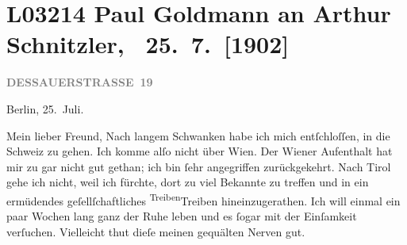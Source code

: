 

\section[ Paul Goldmann an Arthur Schnitzler, 25. 7. {[}1902{]}]{L03214 Paul Goldmann an Arthur Schnitzler,  25. 7. {[}1902{]}}
\nopagebreak{}
\rehead{ }\normalsize\beginnumbering{}
\toendnotes[C]{\smallbreak\pagebreak[2]}
\toendnotes[C]{\smallbreak}
\toendnotes[C]{\smallbreak}
\pstart
           \raggedleft{}{\pb}\textcolor{gray}{\textbf{DESSAUERSTRASSE 19}}\pend
           
\pstart
           Berlin, 25. Juli.\pend
           
\pstart\center{}Mein lieber Freund,\pend\vspace{0.5em}
\pstart
           Nach langem Schwanken habe ich mich entſchloſſen, in die Schweiz zu gehen. Ich komme alſo nicht über Wien. Der Wiener Aufenthalt
               hat mir zu \label{K_L03214-1v}\label{K_L03214-1} gar nicht gut gethan; ich  bin{ }ſehr
               angegriffen zurückgekehrt. Nach Tirol
               gehe ich nicht, weil ich fürchte, dort zu viel Bekannte zu treffen und in ein
               ermüdendes geſellſchaftliches {\pb}\substVorne{}\textsuperscript{Treiben}\substDazwischen{}Treiben\substHinten{} hineinzugerathen. Ich will einmal ein paar Wochen lang ganz der Ruhe leben
               und es{ }ſogar mit der Einſamkeit verſuchen. Vielleicht thut dieſe meinen gequälten
               Nerven gut.\pend
           
